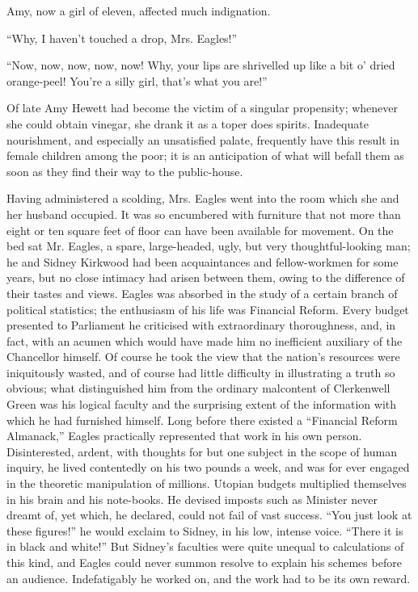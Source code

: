 Amy, now a girl of eleven, affected much indignation.

``Why, I haven't touched a drop, Mrs. Eagles!''

``Now, now, now, now, now! Why, your lips are shrivelled up like a bit
o' dried orange-peel! You're a silly girl, that's what you are!''

Of late Amy Hewett had become the victim of a singular propensity;
whenever she could obtain vinegar, she drank it as a toper does spirits.
Inadequate nourishment, and especially an unsatisfied palate, frequently
have this result in female children among the poor;
{\protect\hypertarget{292}{}{}}it is an anticipation of what will befall
them as soon as they find their way to the public-house.

Having administered a scolding, Mrs. Eagles went into the room which she
and her husband occupied. It was so encumbered with furniture that not
more than eight or ten square feet of floor can have been available for
movement. On the bed sat Mr. Eagles, a spare, large-headed, ugly, but
very thoughtful-looking man; he and Sidney Kirkwood had been
acquaintances and fellow-workmen for some years, but no close intimacy
had arisen between them, owing to the difference of their tastes and
views. Eagles was absorbed in the study of a certain branch of political
statistics; the enthusiasm of his life was Financial Reform. Every
budget presented to Parliament he criticised with extraordinary
thoroughness, and, in fact, with an acumen which would have made him no
inefficient auxiliary of the Chancellor himself. Of course he took the
view that the nation's resources were iniquitously wasted, and of course
had little difficulty in illustrating a truth so
{\protect\hypertarget{293}{}{}}obvious; what distinguished him from the
ordinary malcontent of Clerkenwell Green was his logical faculty and the
surprising extent of the information with which he had furnished
himself. Long before there existed a ``Financial Reform Almanack,''
Eagles practically represented that work in his own person.
Disinterested, ardent, with thoughts for but one subject in the scope of
human inquiry, he lived contentedly on his two pounds a week, and was
for ever engaged in the theoretic manipulation of millions. Utopian
budgets multiplied themselves in his brain and his note-books. He
devised imposts such as Minister never dreamt of, yet which, he
declared, could not fail of vast success. ``You just look at these
figures!'' he would exclaim to Sidney, in his low, intense voice.
``There it is in black and white!'' But Sidney's faculties were quite
unequal to calculations of this kind, and Eagles could never summon
resolve to explain his schemes before an audience. Indefatigably he
worked on, and the work had to be its own reward.

